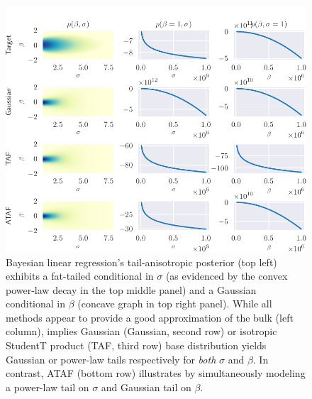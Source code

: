 \documentclass{article}
\theoremstyle{definition}
\theoremstyle{remark}
\begin{document}
\begin{figure}[htbp]
  \centering
  \vspace{-0.5cm}
  \includegraphics{../Figures/blr_aniso.pdf}
  \vspace{-0.5cm}
  \caption{
    Bayesian linear regression's tail-anisotropic posterior
    (top left) exhibits a fat-tailed conditional in $\sigma$ (as evidenced by
    the convex power-law decay in the top middle panel) and a Gaussian conditional in $\beta$ (concave graph in top right panel).
    While all methods appear to provide a good approximation of the bulk (left column),
     implies
    Gaussian (Gaussian, second row) or isotropic StudentT product (TAF, third row) base distribution
    yields Gaussian or power-law tails respectively for \emph{both} $\sigma$ and $\beta$.
    In contrast, ATAF (bottom row) illustrates  by simultaneously
    modeling a power-law tail on $\sigma$ and Gaussian tail on $\beta$.
  }
  \label{fig:blr-anisotropic}
\end{figure}
\end{document}
